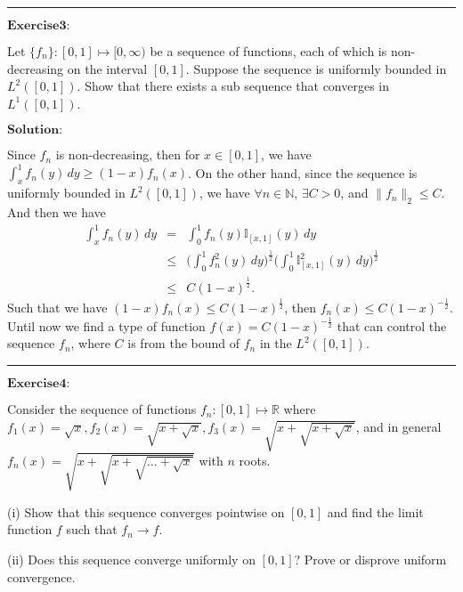 \documentclass[12pt]{article}
\begin{document}
\vspace{8pt}

\noindent\rule[0.25\baselineskip]{\textwidth}{0.5pt}


$\textbf{Exercise3:}$

Let $\{f_{n}\} : [0, 1] \mapsto [0, \infty) $ be a sequence of functions, each of which is non-decreasing on the interval $[0, 1]$. Suppose the sequence is uniformly bounded in $L^{2}([0, 1])$. Show that there exists a sub sequence that converges in $L^{1}([0, 1])$.

\vspace{8pt}
$\textbf{Solution:}$

Since $f_{n}$ is non-decreasing, then for $x \in [0, 1]$, we have $\int_{x}^{1} f_{n}(y) \, d y \geq (1-x) f_{n}(x)$. On the other hand, since the sequence is uniformly bounded in $L^{2}([0, 1])$, we have $\forall n \in \mathbb{N}$, $\exists C > 0$, and $\| f_{n} \|_{2} \leq C$. And then we have
\begin{eqnarray*}
\int_{x}^{1} f_{n}(y) \, d y &=& \int_{0}^{1} f_{n}(y) \mathbb{I}_{[x, 1]} (y) \, d y  \\
            &\leq & \Big( \int_{0}^{1} f^{2}_{n}(y) \, d y \Big)^{\frac{1}{2}} \Big( \int_{0}^{1} \mathbb{I}^{2}_{[x, 1]} (y) \, d y \Big)^{\frac{1}{2}} \\
            &\leq & C (1-x)^{\frac{1}{2}}.
\end{eqnarray*}
Such that we have $(1-x) f_{n}(x) \leq C (1-x)^{\frac{1}{2}}$, then $f_{n}(x) \leq C (1-x)^{- \frac{1}{2}}$. Until now we find a type of function $f(x) = C (1-x)^{- \frac{1}{2}}$ that can control the sequence $f_{n}$, where $C$ is from the bound of $f_{n}$ in the $L^{2}([0, 1])$.

\vspace{8pt}

\noindent\rule[0.25\baselineskip]{\textwidth}{0.5pt}

$\textbf{Exercise4:}$

Consider the sequence of functions $f_{n}: [0, 1] \mapsto \mathbb{R}$ where $f_{1}(x) = \sqrt{x}, f_{2}(x) = \sqrt{x + \sqrt{x}}, f_{3}(x) = \sqrt{x + \sqrt{x + \sqrt{x}}}$, and in general $f_{n}(x) = \sqrt{x + \sqrt{x + \sqrt{\dots + \sqrt{x}}}}$ with $n$ roots.

(i) Show that this sequence converges pointwise on $[0, 1]$ and find the limit function $f$ such that $f_{n} \rightarrow f$.

(ii) Does this sequence converge uniformly on $[0, 1]$? Prove or disprove uniform convergence.
\end{document}
